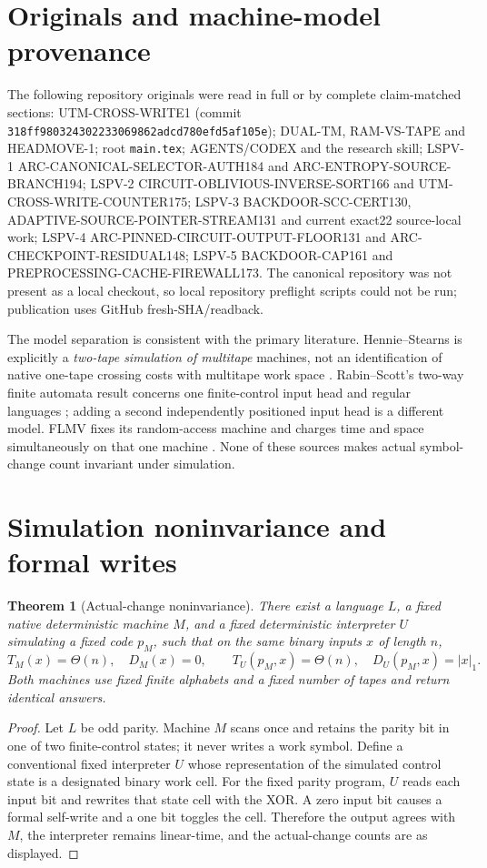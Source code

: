 \documentclass[11pt]{article}
\newtheorem{theorem}{Theorem}
\begin{document}
\section{Originals and machine-model provenance}
The following repository originals were read in full or by complete claim-matched sections: UTM-CROSS-WRITE1 (commit \texttt{318ff980324302233069862adcd780efd5af105e}); DUAL-TM, RAM-VS-TAPE and HEADMOVE-1; root \texttt{main.tex}; AGENTS/CODEX and the research skill; LSPV-1 ARC-CANONICAL-SELECTOR-AUTH184 and ARC-ENTROPY-SOURCE-BRANCH194; LSPV-2 CIRCUIT-OBLIVIOUS-INVERSE-SORT166 and UTM-CROSS-WRITE-COUNTER175; LSPV-3 BACKDOOR-SCC-CERT130, ADAPTIVE-SOURCE-POINTER-STREAM131 and current exact22 source-local work; LSPV-4 ARC-PINNED-CIRCUIT-OUTPUT-FLOOR131 and ARC-CHECKPOINT-RESIDUAL148; LSPV-5 BACKDOOR-CAP161 and PREPROCESSING-CACHE-FIREWALL173.  The canonical repository was not present as a local checkout, so local repository preflight scripts could not be run; publication uses GitHub fresh-SHA/readback.

The model separation is consistent with the primary literature.  Hennie--Stearns is explicitly a \emph{two-tape simulation of multitape} machines, not an identification of native one-tape crossing costs with multitape work space \cite{hs}.  Rabin--Scott's two-way finite automata result concerns one finite-control input head and regular languages \cite{rs}; adding a second independently positioned input head is a different model.  FLMV fixes its random-access machine and charges time and space simultaneously on that one machine \cite{flmv}.  None of these sources makes actual symbol-change count invariant under simulation.

\section{Simulation noninvariance and formal writes}
\begin{theorem}[Actual-change noninvariance]\label{th:noninv}
There exist a language $L$, a fixed native deterministic machine $M$, and a fixed deterministic interpreter $U$ simulating a fixed code $p_M$, such that on the same binary inputs $x$ of length $n$,
\[
T_M(x)=\Theta(n),\quad D_M(x)=0,
\qquad
T_U(p_M,x)=\Theta(n),\quad D_U(p_M,x)=|x|_1.
\]
Both machines use fixed finite alphabets and a fixed number of tapes and return identical answers.
\end{theorem}
\begin{proof}
Let $L$ be odd parity.  Machine $M$ scans once and retains the parity bit in one of two finite-control states; it never writes a work symbol.  Define a conventional fixed interpreter $U$ whose representation of the simulated control state is a designated binary work cell.  For the fixed parity program, $U$ reads each input bit and rewrites that state cell with the XOR.  A zero input bit causes a formal self-write and a one bit toggles the cell.  Therefore the output agrees with $M$, the interpreter remains linear-time, and the actual-change counts are as displayed.
\end{proof}
\end{document}
